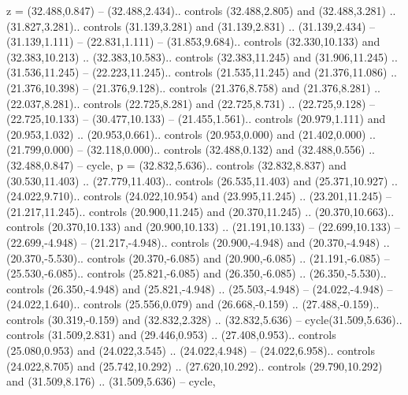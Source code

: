 {z} = {(32.488,0.847) -- (32.488,2.434).. controls (32.488,2.805) and (32.488,3.281) .. (31.827,3.281).. controls (31.139,3.281) and (31.139,2.831) .. (31.139,2.434) -- (31.139,1.111) -- (22.831,1.111) -- (31.853,9.684).. controls (32.330,10.133) and (32.383,10.213) .. (32.383,10.583).. controls (32.383,11.245) and (31.906,11.245) .. (31.536,11.245) -- (22.223,11.245).. controls (21.535,11.245) and (21.376,11.086) .. (21.376,10.398) -- (21.376,9.128).. controls (21.376,8.758) and (21.376,8.281) .. (22.037,8.281).. controls (22.725,8.281) and (22.725,8.731) .. (22.725,9.128) -- (22.725,10.133) -- (30.477,10.133) -- (21.455,1.561).. controls (20.979,1.111) and (20.953,1.032) .. (20.953,0.661).. controls (20.953,0.000) and (21.402,0.000) .. (21.799,0.000) -- (32.118,0.000).. controls (32.488,0.132) and (32.488,0.556) .. (32.488,0.847) -- cycle},
{p} = {(32.832,5.636).. controls (32.832,8.837) and (30.530,11.403) .. (27.779,11.403).. controls (26.535,11.403) and (25.371,10.927) .. (24.022,9.710).. controls (24.022,10.954) and (23.995,11.245) .. (23.201,11.245) -- (21.217,11.245).. controls (20.900,11.245) and (20.370,11.245) .. (20.370,10.663).. controls (20.370,10.133) and (20.900,10.133) .. (21.191,10.133) -- (22.699,10.133) -- (22.699,-4.948) -- (21.217,-4.948).. controls (20.900,-4.948) and (20.370,-4.948) .. (20.370,-5.530).. controls (20.370,-6.085) and (20.900,-6.085) .. (21.191,-6.085) -- (25.530,-6.085).. controls (25.821,-6.085) and (26.350,-6.085) .. (26.350,-5.530).. controls (26.350,-4.948) and (25.821,-4.948) .. (25.503,-4.948) -- (24.022,-4.948) -- (24.022,1.640).. controls (25.556,0.079) and (26.668,-0.159) .. (27.488,-0.159).. controls (30.319,-0.159) and (32.832,2.328) .. (32.832,5.636) -- cycle(31.509,5.636).. controls (31.509,2.831) and (29.446,0.953) .. (27.408,0.953).. controls (25.080,0.953) and (24.022,3.545) .. (24.022,4.948) -- (24.022,6.958).. controls (24.022,8.705) and (25.742,10.292) .. (27.620,10.292).. controls (29.790,10.292) and (31.509,8.176) .. (31.509,5.636) -- cycle},
